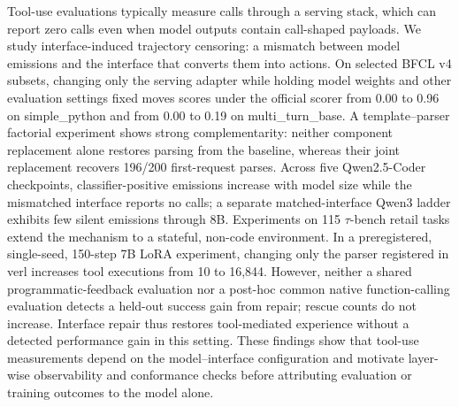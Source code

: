 Tool-use evaluations typically measure calls through a serving stack, which can report zero calls even when model outputs contain call-shaped payloads. We study interface-induced trajectory censoring: a mismatch between model emissions and the interface that converts them into actions. On selected BFCL v4 subsets, changing only the serving adapter while holding model weights and other evaluation settings fixed moves scores under the official scorer from 0.00 to 0.96 on simple\_python and from 0.00 to 0.19 on multi\_turn\_base. A template--parser factorial experiment shows strong complementarity: neither component replacement alone restores parsing from the baseline, whereas their joint replacement recovers 196/200 first-request parses. Across five Qwen2.5-Coder checkpoints, classifier-positive emissions increase with model size while the mismatched interface reports no calls; a separate matched-interface Qwen3 ladder exhibits few silent emissions through 8B. Experiments on 115 $\tau$-bench retail tasks extend the mechanism to a stateful, non-code environment. In a preregistered, single-seed, 150-step 7B LoRA experiment, changing only the parser registered in verl increases tool executions from 10 to 16,844. However, neither a shared programmatic-feedback evaluation nor a post-hoc common native function-calling evaluation detects a held-out success gain from repair; rescue counts do not increase. Interface repair thus restores tool-mediated experience without a detected performance gain in this setting. These findings show that tool-use measurements depend on the model--interface configuration and motivate layer-wise observability and conformance checks before attributing evaluation or training outcomes to the model alone.
